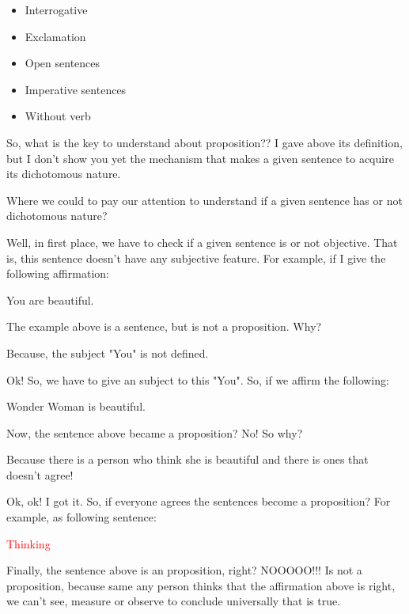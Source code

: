 \begin{itemize}
    \item Interrogative
    \item Exclamation
    \item Open sentences
    \item Imperative sentences
    \item Without verb
\end{itemize}

So, what is the key to understand about proposition?? I gave above its definition, but I don't show you yet the mechanism that makes a given sentence to acquire its dichotomous nature.

Where we could to pay our attention to understand if a given sentence has or not dichotomous nature?

Well, in first place, we have to check if a given sentence is or not objective. That is, this sentence doesn't have any subjective feature. For example, if I give the following affirmation:

\begin{example}\label{exemplo1}
    You are beautiful.
\end{example}

The example above is a sentence, but is not a proposition. Why?

Because, the subject "You" is not defined.

Ok! So, we have to give an subject to this "You". So, if we affirm the following:

\begin{example}
    Wonder Woman is beautiful.
\end{example}

Now, the sentence above became a proposition? No! So why?

Because there is a person who think she is beautiful and there is ones that doesn't agree!

Ok, ok! I got it. So, if everyone agrees the sentences become a proposition? For example, as following sentence:

\begin{example}[\textcolor{red}{A sentence that is subjective and everyone agree (this is very difficult)}]
    \textcolor{red}{Thinking}
\end{example}

Finally, the sentence above is an proposition, right? NOOOOO!!! Is not a proposition, because same any person thinks that the affirmation above is right, we can't see, measure or observe to conclude universally that is true.

